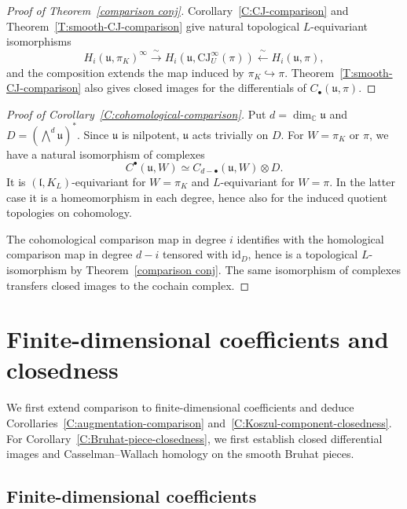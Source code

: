 \documentclass[a4paper,12pt]{amsart}
\numberwithin{equation}{section}
\theoremstyle{plain}
\theoremstyle{definition}
\theoremstyle{remark}
\begin{document}
\begin{proof}[Proof of Theorem~\ref{comparison conj}]
Corollary~\ref{C:CJ-comparison} and Theorem~\ref{T:smooth-CJ-comparison} give natural topological $L$-equivariant isomorphisms
\begin{equation}\label{iso comp eq}
 H_i(\mathfrak u,\pi_K)^\infty
 \xrightarrow{\ \sim\ }
 H_i(\mathfrak u,\mathrm{CJ}^{\infty}_U(\pi))
 \xleftarrow{\ \sim\ }H_i(\mathfrak u,\pi),
\end{equation}
and the composition extends the map induced by $\pi_K\hookrightarrow\pi$.
Theorem~\ref{T:smooth-CJ-comparison} also gives closed images for the differentials of $C_\bullet(\mathfrak u,\pi)$.
\end{proof}

\begin{proof}[Proof of Corollary~\ref{C:cohomological-comparison}]
Put $d=\dim_{\mathbb C}\mathfrak u$ and $D=(\bigwedge^d\mathfrak u)^*$.
Since $\mathfrak u$ is nilpotent, $\mathfrak u$ acts trivially on $D$.
For $W=\pi_K$ or $\pi$, we have a natural isomorphism of complexes
\[
 C^\bullet(\mathfrak u,W)
 \simeq C_{d-\bullet}(\mathfrak u,W)\otimes D.
\]
It is $(\mathfrak l,K_L)$-equivariant for $W=\pi_K$ and $L$-equivariant for $W=\pi$.
In the latter case it is a homeomorphism in each degree, hence also for the induced quotient topologies on cohomology.

The cohomological comparison map in degree $i$ identifies with the homological comparison map in degree $d-i$ tensored with $\mathrm{id}_D$, hence is a topological $L$-isomorphism by Theorem~\ref{comparison conj}.
The same isomorphism of complexes transfers closed images to the cochain complex.
\end{proof}

\section{Finite-dimensional coefficients and closedness}\label{S:finite-coefficients}

We first extend comparison to finite-dimensional coefficients and deduce Corollaries~\ref{C:augmentation-comparison} and~\ref{C:Koszul-component-closedness}.
For Corollary~\ref{C:Bruhat-piece-closedness}, we first establish closed differential images and Casselman--Wallach homology on the smooth Bruhat pieces.

\subsection{Finite-dimensional coefficients}\label{S:finite-coefficient-comparison}
\end{document}
